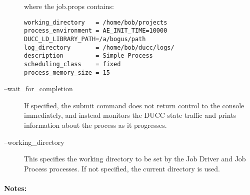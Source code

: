 \begin{description}
          where the job.props contains: 
\begin{verbatim}
working_directory   = /home/bob/projects
process_environment = AE_INIT_TIME=10000 DUCC_LD_LIBRARY_PATH=/a/bogus/path 
log_directory       = /home/bob/ducc/logs/ 
description         = Simple Process
scheduling_class    = fixed 
process_memory_size = 15 
\end{verbatim}

        \item[--wait\_for\_completion ] If specified, the submit command does not return control to
          the console immediately, and instead monitors the DUCC state traffic and prints
          information about the process as it progresses.
          
        \item[--working\_directory ] This specifies the working directory to be set by the Job
          Driver and Job Process processes.  If not specified, the current directory is used.

     \end{description}
        
    \paragraph{Notes:}

